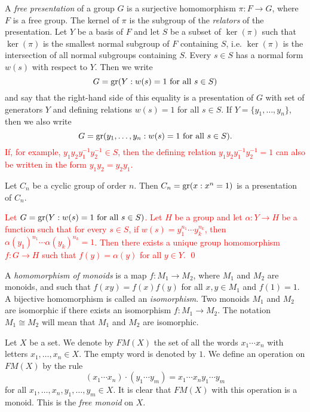 A {\em free presentation} of a group $G$ is a surjective homomorphism $\pi \colon F\rightarrow G$, where $F$ is a free group. The kernel of $\pi$ is the subgroup of the {\em relators} of the presentation. Let $Y$ be a basis of $F$ and let $S$ be a subset of $\ker(\pi)$ such that $\ker(\pi)$ is the smallest normal subgroup of $F$ containing $S$, i.e. $\ker(\pi)$ is the intersection of all normal subgroups containing $S$. Every $s\in S$ has a normal form $w(s)$ with respect to $Y$.
Then we write
\[
G=\operatorname{gr}(Y: w(s)=1\mbox{ for all }s\in S)
\]
and say that the right-hand side of this equality is a presentation of $G$ with set of generators $Y$ and defining relations $w(s)=1$ 
for all $s\in S$. If $Y=\{ y_1,\dots, y_n\}$, then we also write
\[
G=\operatorname{gr}(y_1,\dots, y_n: w(s)=1\mbox{ for all }s\in S).
\]
\textcolor{red}{ If, for example, $y_1y_2y_1^{-1}y_2^{-1}\in S$, then the defining relation $y_1y_2y_1^{-1}y_2^{-1}=1$ can also be written in the form $y_1y_2=y_2y_1$. }

\begin{example}
    Let $C_n$ be a cyclic group of order $n$. 
    Then $C_n=\operatorname{gr}(x: x^n=1)$ is a presentation of $C_n$.
\end{example}

\textcolor{red}{
\begin{proposition}\label{prop:presentation}
Let $G=\operatorname{gr}(Y: w(s)=1\mbox{ for all }s\in S)$. Let $H$ be a group and let $\alpha\colon Y\rightarrow H$ be a function such that for every $s\in S$, if $w(s)=y_1^{n_1}\cdots y_k^{n_k}$, then $\alpha(y_1)^{n_1}\cdots \alpha(y_k)^{n_k}=1$. Then there exists a unique group homomorphism $f\colon G\rightarrow H$ such that $f(y)=\alpha(y)$ for all $y\in Y$. \qed
\end{proposition}}

A {\em homomorphism of monoids} is a map $f\colon M_1\rightarrow M_2$, where $M_1$ and $M_2$ are monoids, and such that $f(xy)=f(x)f(y)$ for all $x,y\in M_1$ and $f(1)=1$. A bijective homomorphism is called an {\em isomorphism}. Two monoids $M_1$ and $M_2$ are isomorphic if there exists an isomorphism $f\colon M_1\rightarrow M_2$. The notation $M_1\cong M_2$ will mean that $M_1$ and $M_2$ are isomorphic. 

Let $X$ be a set. We denote by $FM(X)$ the set of all the words $x_1\cdots x_n$ with letters $x_1,\dots ,x_n\in X$. The empty word is denoted by $1$. We define an operation on $FM(X)$ by the rule
\[ (x_1\cdots x_n)\cdot (y_1\cdots y_m)=x_1\cdots x_ny_1\cdots y_m\]
for all $x_1,\dots ,x_n,y_1,\dots ,y_m\in X$. It is clear that $FM(X)$ with this operation is a monoid. This is the {\em free monoid} on $X$.

